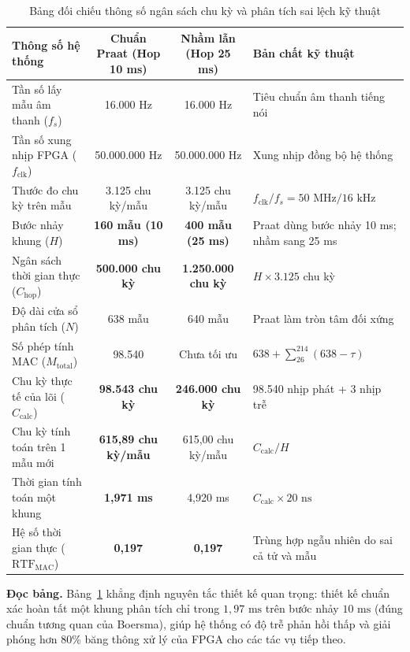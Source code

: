 \begin{table}[htbp]
\centering
\footnotesize
\setlength{\tabcolsep}{3.5pt}
\caption{Bảng đối chiếu thông số ngân sách chu kỳ và phân tích sai lệch kỹ thuật}
\label{tab:ch02_cycle_budget}
\begin{tabularx}{\textwidth}{p{4.2cm}ccX}
\toprule
Thông số hệ thống & Chuẩn Praat (Hop 10 ms) & Nhầm lẫn (Hop 25 ms) & Bản chất kỹ thuật \\
\midrule
Tần số lấy mẫu âm thanh ($f_s$) & 16.000 Hz & 16.000 Hz & Tiêu chuẩn âm thanh tiếng nói \\
Tần số xung nhịp FPGA ($f_{\text{clk}}$) & 50.000.000 Hz & 50.000.000 Hz & Xung nhịp đồng bộ hệ thống \\
Thước đo chu kỳ trên mẫu & 3.125 chu kỳ/mẫu & 3.125 chu kỳ/mẫu & $f_{\text{clk}} / f_s = 50\text{ MHz} / 16\text{ kHz}$ \\
Bước nhảy khung ($H$) & \textbf{160 mẫu (10 ms)} & \textbf{400 mẫu (25 ms)} & Praat dùng bước nhảy 10 ms; nhầm sang 25 ms \\
Ngân sách thời gian thực ($C_{\text{hop}}$) & \textbf{500.000 chu kỳ} & \textbf{1.250.000 chu kỳ} & $H \times 3.125$ chu kỳ \\
Độ dài cửa sổ phân tích ($N$) & 638 mẫu & 640 mẫu & Praat làm tròn tâm đối xứng \\
Số phép tính MAC ($M_{\text{total}}$) & 98.540 & Chưa tối ưu & $638 + \sum_{26}^{214} (638 - \tau)$ \\
Chu kỳ thực tế của lõi ($C_{\text{calc}}$) & \textbf{98.543 chu kỳ} & \textbf{246.000 chu kỳ} & 98.540 nhịp phát + 3 nhịp trễ \\
Chu kỳ tính toán trên 1 mẫu mới & \textbf{615,89 chu kỳ/mẫu} & 615,00 chu kỳ/mẫu & $C_{\text{calc}} / H$ \\
Thời gian tính toán một khung & \textbf{1,971 ms} & 4,920 ms & $C_{\text{calc}} \times 20\text{ ns}$ \\
Hệ số thời gian thực ($\text{RTF}_{\text{MAC}}$) & \textbf{0,197} & \textbf{0,197} & Trùng hợp ngẫu nhiên do sai cả tử và mẫu \\
\bottomrule
\end{tabularx}
\end{table}

\textbf{Đọc bảng.} Bảng~\ref{tab:ch02_cycle_budget} khẳng định nguyên tắc thiết kế quan trọng: thiết kế chuẩn xác hoàn tất một khung phân tích chỉ trong $1{,}97\text{ ms}$ trên bước nhảy $10\text{ ms}$ (đúng chuẩn tương quan của Boersma), giúp hệ thống có độ trễ phản hồi thấp và giải phóng hơn 80\% băng thông xử lý của FPGA cho các tác vụ tiếp theo.

